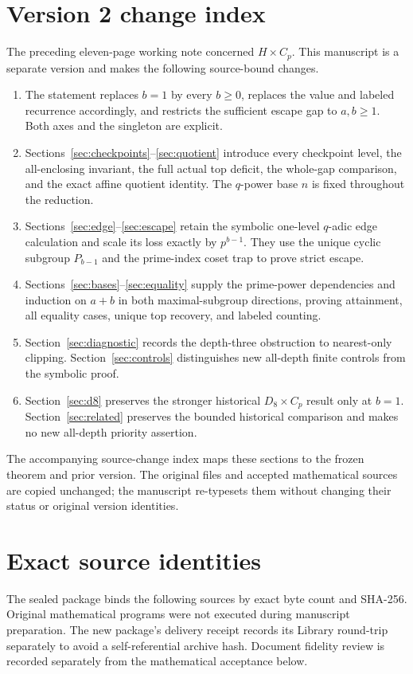 \documentclass[11pt,letterpaper]{article}
\theoremstyle{definition}\newtheorem{definition}{Definition}
\begin{document}
\section{Version 2 change index}\label{app:changes}
The preceding eleven-page working note concerned $H\times C_p$. This manuscript is a separate version and makes the following source-bound changes.
\begin{enumerate}
\item The statement replaces $b=1$ by every $b\ge0$, replaces the value and labeled recurrence accordingly, and restricts the sufficient escape gap to $a,b\ge1$. Both axes and the singleton are explicit.
\item Sections~\ref{sec:checkpoints}--\ref{sec:quotient} introduce every checkpoint level, the all-enclosing invariant, the full actual top deficit, the whole-gap comparison, and the exact affine quotient identity. The $q$-power base $n$ is fixed throughout the reduction.
\item Sections~\ref{sec:edge}--\ref{sec:escape} retain the symbolic one-level $q$-adic edge calculation and scale its loss exactly by $p^{b-1}$. They use the unique cyclic subgroup $P_{b-1}$ and the prime-index coset trap to prove strict escape.
\item Sections~\ref{sec:bases}--\ref{sec:equality} supply the prime-power dependencies and induction on $a+b$ in both maximal-subgroup directions, proving attainment, all equality cases, unique top recovery, and labeled counting.
\item Section~\ref{sec:diagnostic} records the depth-three obstruction to nearest-only clipping. Section~\ref{sec:controls} distinguishes new all-depth finite controls from the symbolic proof.
\item Section~\ref{sec:d8} preserves the stronger historical $D_8\times C_p$ result only at $b=1$. Section~\ref{sec:related} preserves the bounded historical comparison and makes no new all-depth priority assertion.
\end{enumerate}
The accompanying source-change index maps these sections to the frozen theorem and prior version. The original files and accepted mathematical sources are copied unchanged; the manuscript re-typesets them without changing their status or original version identities.

\section{Exact source identities}\label{app:provenance}
The sealed package binds the following sources by exact byte count and SHA-256. Original mathematical programs were not executed during manuscript preparation. The new package's delivery receipt records its Library round-trip separately to avoid a self-referential archive hash. Document fidelity review is recorded separately from the mathematical acceptance below.
\end{document}
